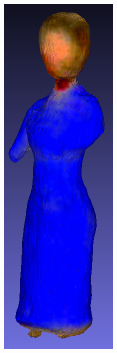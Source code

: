 \begin{figure}[H]
\begin{subfigure}[b]{0.106\textwidth}
        \includegraphics[width=\textwidth]{etc/bias/bias_teacher_dreamfusion.png}

\end{subfigure}
\end{figure}
